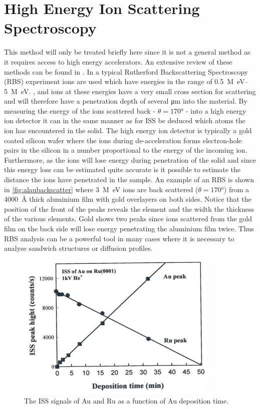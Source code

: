 \section{High Energy Ion Scattering Spectroscopy}
This method will only be treated briefly here since it is not a general method as it requires access to high energy accelerators. An extensive review of these methods can be found in \cite{feldman}. In a typical Rutherford Backscattering Spectroscopy (RBS) experiment ions are used which have energies in the range of \SIrange{0.5}{5}{M\electronvolt}. ,  and  ions at these energies have a very small cross section for scattering and will therefore have a penetration depth of several \si{\micro m} into the material. By measuring the energy of the ions scattered back - $\theta=\ang{170}$  - into a high energy ion detector it can in the same manner as for ISS be deduced which atoms the ion has encountered in the solid. The high energy ion detector is typically a gold coated silicon wafer where the ions during de-acceleration forms electron-hole pairs in the silicon in a number proportional to the energy of the incoming ion. Furthermore, as the ions will lose energy during penetration of the solid and since this energy loss can be estimated quite accurate is it possible to estimate the distance the ions have penetrated in the sample. An example of an RBS is shown in \autoref{fig:alaubackscatter} where \SI{3}{M\electronvolt}  ions are back scattered ($\theta=\ang{170}$) from a \SI{4000}{\angstrom} thick aluminium film with gold overlayers on both sides. Notice that the position of the front of the peaks reveals the element and the width the thickness of the various elements. Gold shows two peaks since ions scattered from the gold film on the back side will lose energy penetrating the aluminium film twice. Thus RBS analysis can be a powerful tool in many cases where it is necessary to analyse sandwich structures or diffusion profiles.

\begin{figure}[h!]
	\begin{center}
	\includegraphics[scale=4]{figures/11_04.png}
	\caption{The ISS signals of Au and Ru as a function of Au deposition time.}
	\label{fig:auruisstime}
	\end{center}
\end{figure}

